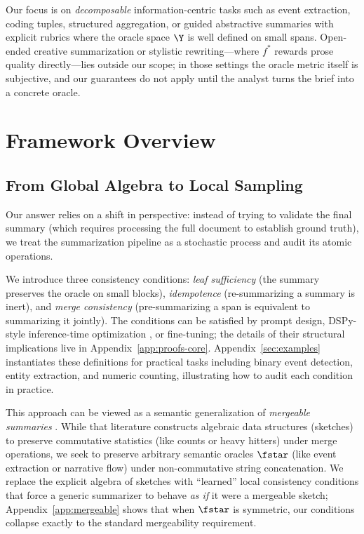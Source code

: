 Our focus is on \emph{decomposable} information-centric tasks such as event extraction, coding tuples, structured aggregation, or guided abstractive summaries with explicit rubrics where the oracle space $\Y$ is well defined on small spans. Open-ended creative summarization or stylistic rewriting---where $f^*$ rewards prose quality directly---lies outside our scope; in those settings the oracle metric itself is subjective, and our guarantees do not apply until the analyst turns the brief into a concrete oracle.
\section{Framework Overview}\label{sec:overview}

\subsection{From Global Algebra to Local Sampling}

Our answer relies on a shift in perspective: instead of trying to validate the final summary (which requires processing the full document to establish ground truth), we treat the summarization pipeline as a stochastic process and audit its atomic operations.

We introduce three consistency conditions: \emph{leaf sufficiency} (the summary preserves the oracle on small blocks), \emph{idempotence} (re-summarizing a summary is inert), and \emph{merge consistency} (pre-summarizing a span is equivalent to summarizing it jointly). The conditions can be satisfied by prompt design, DSPy-style inference-time optimization \citep{khattab2024dspy}, or fine-tuning; the details of their structural implications live in Appendix~\ref{app:proofs-core}. Appendix~\ref{sec:examples} instantiates these definitions for practical tasks including binary event detection, entity extraction, and numeric counting, illustrating how to audit each condition in practice.

This approach can be viewed as a semantic generalization of \emph{mergeable summaries} \cite{agarwal2013mergeable}. While that literature constructs algebraic data structures (sketches) to preserve commutative statistics (like counts or heavy hitters) under merge operations, we seek to preserve arbitrary semantic oracles $\fstar$ (like event extraction or narrative flow) under non-commutative string concatenation. We replace the explicit algebra of sketches with ``learned'' local consistency conditions that force a generic summarizer to behave \emph{as if} it were a mergeable sketch; Appendix~\ref{app:mergeable} shows that when $\fstar$ is symmetric, our conditions collapse exactly to the standard mergeability requirement.

